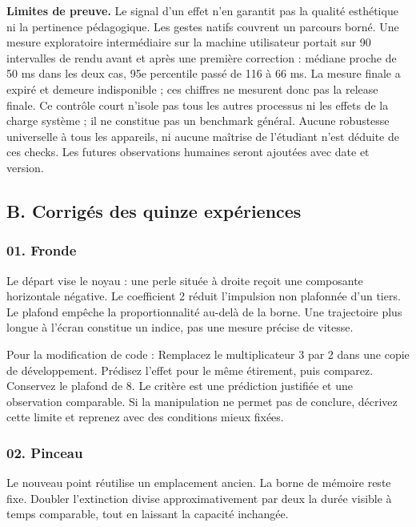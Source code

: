 \documentclass[
  canadien,
  11pt,
  letterpaper,
]{article}
\begin{document}
\textbf{Limites de preuve.} Le signal d'un effet n'en garantit pas la
qualité esthétique ni la pertinence pédagogique. Les gestes natifs
couvrent un parcours borné. Une mesure exploratoire intermédiaire sur la
machine utilisateur portait sur 90 intervalles de rendu avant et après
une première correction : médiane proche de 50 ms dans les deux cas, 95e
percentile passé de 116 à 66 ms. La mesure finale a expiré et demeure
indisponible ; ces chiffres ne mesurent donc pas la release finale. Ce
contrôle court n'isole pas tous les autres processus ni les effets de la
charge système ; il ne constitue pas un benchmark général. Aucune
robustesse universelle à tous les appareils, ni aucune maîtrise de
l'étudiant n'est déduite de ces checks. Les futures observations
humaines seront ajoutées avec date et version.

\subsection{B. Corrigés des quinze
expériences}\label{b.-corriguxe9s-des-quinze-expuxe9riences}

\subsubsection{01. Fronde}\label{fronde}

Le départ vise le noyau : une perle située à droite reçoit une
composante horizontale négative. Le coefficient 2 réduit l'impulsion non
plafonnée d'un tiers. Le plafond empêche la proportionnalité au-delà de
la borne. Une trajectoire plus longue à l'écran constitue un indice, pas
une mesure précise de vitesse.

Pour la modification de code : Remplacez le multiplicateur 3 par 2 dans
une copie de développement. Prédisez l'effet pour le même étirement,
puis comparez. Conservez le plafond de 8. Le critère est une prédiction
justifiée et une observation comparable. Si la manipulation ne permet
pas de conclure, décrivez cette limite et reprenez avec des conditions
mieux fixées.

\subsubsection{02. Pinceau}\label{pinceau}

Le nouveau point réutilise un emplacement ancien. La borne de mémoire
reste fixe. Doubler l'extinction divise approximativement par deux la
durée visible à temps comparable, tout en laissant la capacité
inchangée.
\end{document}
